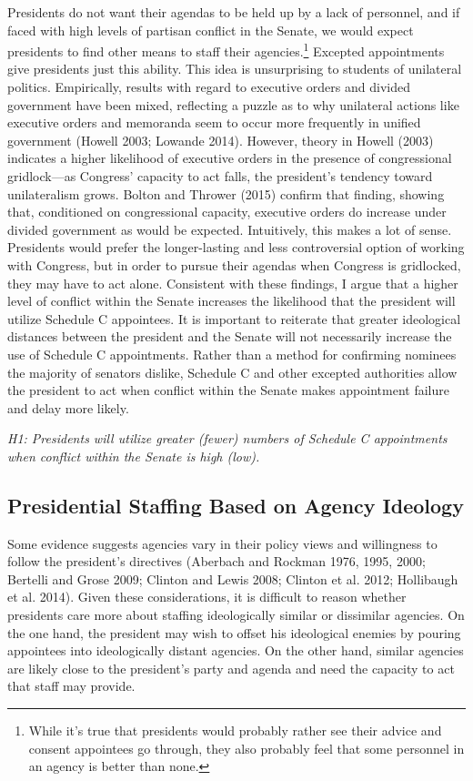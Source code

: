 \documentclass[12pt]{article}
\begin{document}
Presidents do not want their agendas to be held up by a lack of personnel, and if faced with high levels of partisan conflict in the Senate, we would expect presidents to find other means to staff their agencies.\footnote{While it's true that presidents would probably rather see their advice and consent appointees go through, they also probably feel that some personnel in an agency is better than none.} Excepted appointments give presidents just this ability. This idea is unsurprising to students of unilateral politics. Empirically, results with regard to executive orders and divided government have been mixed, reflecting a puzzle as to why unilateral actions like executive orders and memoranda seem to occur more frequently in unified government (Howell 2003; Lowande 2014). However, theory in Howell (2003) indicates a higher likelihood of executive orders in the presence of congressional gridlock---as Congress' capacity to act falls, the president's tendency toward unilateralism grows. Bolton and Thrower (2015) confirm that finding, showing that, conditioned on congressional capacity, executive orders do increase under divided government as would be expected. Intuitively, this makes a lot of sense. Presidents would prefer the longer-lasting and less controversial option of working with Congress, but in order to pursue their agendas when Congress is gridlocked, they may have to act alone. Consistent with these findings, I argue that a higher level of conflict within the Senate increases the likelihood that the president will utilize Schedule C appointees. It is important to reiterate that greater ideological distances between the president and the Senate will not necessarily increase the use of Schedule C appointments. Rather than a method for confirming nominees the majority of senators dislike, Schedule C and other excepted authorities allow the president to act when conflict within the Senate makes appointment failure and delay more likely.

\textit{H1: Presidents will utilize greater (fewer) numbers of Schedule C appointments when conflict within the Senate is high (low).}

\subsection*{Presidential Staffing Based on Agency Ideology}

Some evidence suggests agencies vary in their policy views and willingness to follow the president's directives (Aberbach and Rockman 1976, 1995, 2000; Bertelli and Grose 2009; Clinton and Lewis 2008; Clinton et al. 2012; Hollibaugh et al. 2014). Given these considerations, it is difficult to reason whether presidents care more about staffing ideologically similar or dissimilar agencies. On the one hand, the president may wish to offset his ideological enemies by pouring appointees into ideologically distant agencies. On the other hand, similar agencies are likely close to the president's party and agenda and need the capacity to act that staff may provide.
\end{document}
